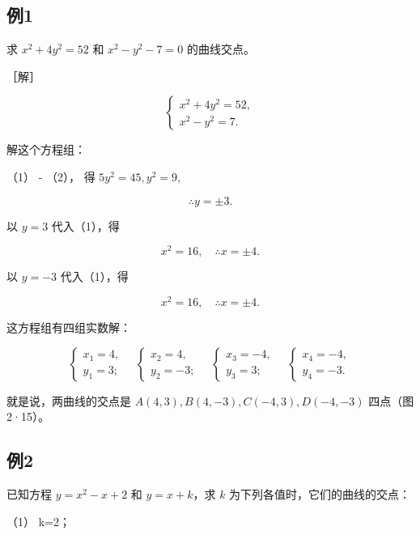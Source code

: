 \subsection{例1}\label{ux4f8b1-11}

求 \(x^{2} + 4y^{2} = 52\) 和 \(x^{2} - y^{2} - 7 = 0\) 的曲线交点。

［解］

\[
\left\{ \begin{array}{l} x^{2} + 4 y^{2} = 52, \\ x^{2} - y^{2} = 7. \end{array} \right. \tag {1}
\]

解这个方程组：

（1） - （2）， 得 \(5y^{2} = 45, y^{2} = 9,\)

\[
\therefore y = \pm 3.
\]

以 \(y = 3\) 代入（1），得

\[
x^{2} = 16, \quad \therefore x = \pm 4.
\]

以 \(y = -3\) 代入（1），得

\[
x^{2} = 16, \quad \therefore x = \pm 4.
\]

这方程组有四组实数解：

\[
\left\{ \begin{array}{l} x_{1} = 4, \\ y_{1} = 3; \end{array} \right. \quad \left\{ \begin{array}{l} x_{2} = 4, \\ y_{2} = - 3; \end{array} \right. \quad \left\{ \begin{array}{l} x_{3} = - 4, \\ y_{3} = 3; \end{array} \right. \quad \left\{ \begin{array}{l} x_{4} = - 4, \\ y_{4} = - 3. \end{array} \right.
\]

就是说，两曲线的交点是 \(A(4,3), B(4,-3), C(-4,3), D(-4,-3)\)
四点（图2·15）。

\subsection{例2}\label{ux4f8b2-10}

已知方程 \(y = x^2 - x + 2\) 和 \(y = x + k\)，求 \(k\)
为下列各值时，它们的曲线的交点：

（1） k=2；

